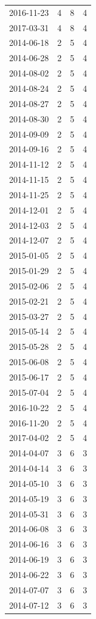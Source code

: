 \begin{tabular}{lrrr}
2016-11-23 & 4 & 8 & 4 \\
2017-03-31 & 4 & 8 & 4 \\
2014-06-18 & 2 & 5 & 4 \\
2014-06-28 & 2 & 5 & 4 \\
2014-08-02 & 2 & 5 & 4 \\
2014-08-24 & 2 & 5 & 4 \\
2014-08-27 & 2 & 5 & 4 \\
2014-08-30 & 2 & 5 & 4 \\
2014-09-09 & 2 & 5 & 4 \\
2014-09-16 & 2 & 5 & 4 \\
2014-11-12 & 2 & 5 & 4 \\
2014-11-15 & 2 & 5 & 4 \\
2014-11-25 & 2 & 5 & 4 \\
2014-12-01 & 2 & 5 & 4 \\
2014-12-03 & 2 & 5 & 4 \\
2014-12-07 & 2 & 5 & 4 \\
2015-01-05 & 2 & 5 & 4 \\
2015-01-29 & 2 & 5 & 4 \\
2015-02-06 & 2 & 5 & 4 \\
2015-02-21 & 2 & 5 & 4 \\
2015-03-27 & 2 & 5 & 4 \\
2015-05-14 & 2 & 5 & 4 \\
2015-05-28 & 2 & 5 & 4 \\
2015-06-08 & 2 & 5 & 4 \\
2015-06-17 & 2 & 5 & 4 \\
2015-07-04 & 2 & 5 & 4 \\
2016-10-22 & 2 & 5 & 4 \\
2016-11-20 & 2 & 5 & 4 \\
2017-04-02 & 2 & 5 & 4 \\
2014-04-07 & 3 & 6 & 3 \\
2014-04-14 & 3 & 6 & 3 \\
2014-05-10 & 3 & 6 & 3 \\
2014-05-19 & 3 & 6 & 3 \\
2014-05-31 & 3 & 6 & 3 \\
2014-06-08 & 3 & 6 & 3 \\
2014-06-16 & 3 & 6 & 3 \\
2014-06-19 & 3 & 6 & 3 \\
2014-06-22 & 3 & 6 & 3 \\
2014-07-07 & 3 & 6 & 3 \\
2014-07-12 & 3 & 6 & 3 \\

\end{tabular}
